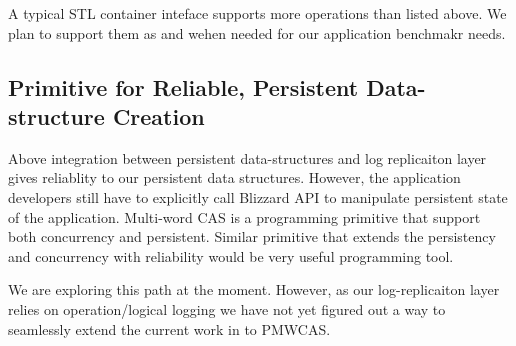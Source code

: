 A typical STL container inteface supports more operations than listed above. We plan to support them
as and wehen needed for our application benchmakr needs.

\subsection{Primitive for Reliable, Persistent Data-structure Creation}

Above integration between persistent data-structures and log replicaiton layer
gives reliablity to our persistent data structures. However, the application developers 
still have to explicitly call Blizzard API to manipulate persistent state of the application.
Multi-word CAS is a programming primitive that support both concurrency and persistent. Similar
primitive that extends the persistency and concurrency with reliability would be very useful
programming tool.

We are exploring this path at the moment. However, as our log-replicaiton layer relies on operation/logical
logging we have not yet figured out a way to seamlessly extend the current work in to PMWCAS.




